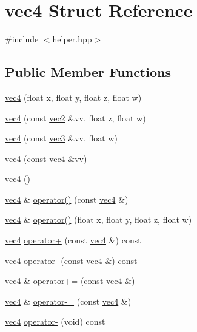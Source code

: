 \hypertarget{structvec4}{\section{vec4 Struct Reference}
\label{structvec4}
}


{\ttfamily \#include $<$helper.\+hpp$>$}

\subsection*{Public Member Functions}
\begin{DoxyCompactItemize}
\item 
\hyperlink{structvec4_a4174b718621ba5b473ea2c289f11fe46}{vec4} (float x, float y, float z, float w)
\item 
\hyperlink{structvec4_ab203f1386ef0b79671e9a1324ceee484}{vec4} (const \hyperlink{structvec2}{vec2} \&vv, float z, float w)
\item 
\hyperlink{structvec4_a8ba17db652f62b23a98cd481390f35da}{vec4} (const \hyperlink{structvec3}{vec3} \&vv, float w)
\item 
\hyperlink{structvec4_a6e60f39758cb651bd4c8fba56119dfad}{vec4} (const \hyperlink{structvec4}{vec4} \&vv)
\item 
\hyperlink{structvec4_aa29685cf2528dae6ad7d74a7e01c1d6f}{vec4} ()
\item 
\hyperlink{structvec4}{vec4} \& \hyperlink{structvec4_ac4e06f2b7a49cd0c3cc5ea7b10954c00}{operator()} (const \hyperlink{structvec4}{vec4} \&)
\item 
\hyperlink{structvec4}{vec4} \& \hyperlink{structvec4_a6acc9e41ef36534bf19b997584eb9df7}{operator()} (float x, float y, float z, float w)
\item 
\hyperlink{structvec4}{vec4} \hyperlink{structvec4_aa64bbda7f03446e55173b504e3b90dfb}{operator+} (const \hyperlink{structvec4}{vec4} \&) const 
\item 
\hyperlink{structvec4}{vec4} \hyperlink{structvec4_ad2e9143d8272682349c159841c668154}{operator-\/} (const \hyperlink{structvec4}{vec4} \&) const 
\item 
\hyperlink{structvec4}{vec4} \& \hyperlink{structvec4_aa8a7cfc967df78a799519bb3bbdaf52f}{operator+=} (const \hyperlink{structvec4}{vec4} \&)
\item 
\hyperlink{structvec4}{vec4} \& \hyperlink{structvec4_a9e9e9191d4dae56b2d2936c94cda27c6}{operator-\/=} (const \hyperlink{structvec4}{vec4} \&)
\item 
\hyperlink{structvec4}{vec4} \hyperlink{structvec4_a8be92ecc5684b4c49e6ae5dacd6ea699}{operator-\/} (void) const 

\end{DoxyCompactItemize}
